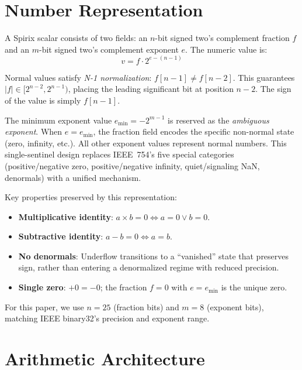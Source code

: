 \documentclass[10pt,twocolumn]{article}
\begin{document}
\section{Number Representation}
\label{sec:format}

A Spirix scalar consists of two fields: an $n$-bit signed two's complement
fraction $f$ and an $m$-bit signed two's complement exponent $e$.  The
numeric value is:
\begin{equation}
  v = f \cdot 2^{e-(n-1)}
\end{equation}

\noindent Normal values satisfy \emph{N-1 normalization}: $f[n{-}1] \neq f[n{-}2]$.
This guarantees $|f| \in [2^{n-2}, 2^{n-1})$, placing the leading
significant bit at position $n{-}2$.  The sign of the value is simply
$f[n{-}1]$.

The minimum exponent value $e_{\min} = -2^{m-1}$ is reserved as the
\emph{ambiguous exponent}.  When $e = e_{\min}$, the fraction field
encodes the specific non-normal state (zero, infinity, etc.).  All other
exponent values represent normal numbers.  This single-sentinel design
replaces IEEE~754's five special categories (positive/negative zero,
positive/negative infinity, quiet/signaling NaN, denormals) with a
unified mechanism.

Key properties preserved by this representation:
\begin{itemize}
  \item \textbf{Multiplicative identity}: $a \times b = 0 \iff a = 0
        \lor b = 0$.
  \item \textbf{Subtractive identity}: $a - b = 0 \iff a = b$.
  \item \textbf{No denormals}: Underflow transitions to a ``vanished''
        state that preserves sign, rather than entering a denormalized
        regime with reduced precision.
  \item \textbf{Single zero}: $+0 = -0$; the fraction $f = 0$ with
        $e = e_{\min}$ is the unique zero.
\end{itemize}

For this paper, we use $n = 25$ (fraction bits) and $m = 8$ (exponent
bits), matching IEEE binary32's precision and exponent range.

\section{Arithmetic Architecture}
\label{sec:arch}
\end{document}
